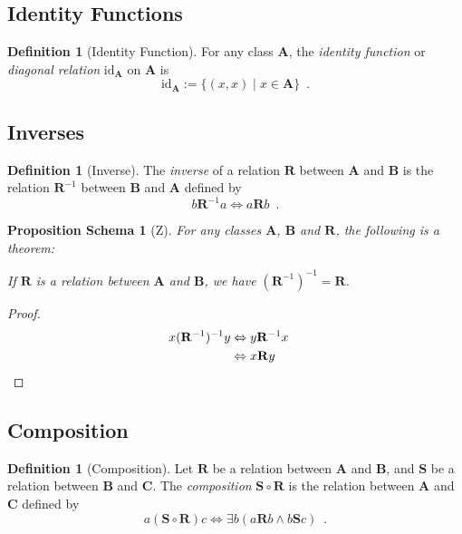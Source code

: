 \documentclass{book}
\let\qed\relax
\newtheorem{props}[ax]{Proposition Schema}
\theoremstyle{definition}
\newtheorem{df}[ax]{Definition}
\begin{document}
\subsection{Identity Functions}

\begin{df}[Identity Function]
For any class $\mathbf{A}$, the \emph{identity function} or \emph{diagonal relation} $\mathrm{id}_\mathbf{A}$ on $\mathbf{A}$ is
\[ \mathrm{id}_\mathbf{A} := \{(x,x) \mid x \in \mathbf{A} \} \enspace . \]
\end{df}

\subsection{Inverses}

\begin{df}[Inverse]
The \emph{inverse} of a relation $\mathbf{R}$ between $\mathbf{A}$ and $\mathbf{B}$ is the relation $\mathbf{R}^{-1}$ between $\mathbf{B}$ and $\mathbf{A}$ defined by
\[ b \mathbf{R}^{-1} a \Leftrightarrow a \mathbf{R} b \enspace . \]
\end{df}

\begin{props}[Z]
For any classes $\mathbf{A}$, $\mathbf{B}$ and $\mathbf{R}$, the following is a theorem:

If $\mathbf{R}$ is a relation between $\mathbf{A}$ and $\mathbf{B}$, we have $(\mathbf{R}^{-1})^{-1} = \mathbf{R}$.
\end{props}

\begin{proof}
\pf
\begin{align*}
x (\mathbf{R}^{-1})^{-1} y & \Leftrightarrow y \mathbf{R}^{-1} x \\
& \Leftrightarrow x \mathbf{R} y & \qed
\end{align*}
\end{proof}

\subsection{Composition}

\begin{df}[Composition]
Let $\mathbf{R}$ be a relation between $\mathbf{A}$ and $\mathbf{B}$, and $\mathbf{S}$ be a relation between $\mathbf{B}$ and $\mathbf{C}$. The \emph{composition} $\mathbf{S} \circ \mathbf{R}$ is the relation between $\mathbf{A}$ and $\mathbf{C}$ defined by
\[ a (\mathbf{S} \circ \mathbf{R}) c \Leftrightarrow \exists b (a \mathbf{R} b \wedge b \mathbf{S} c) \enspace. \]
\end{df}
\end{document}
